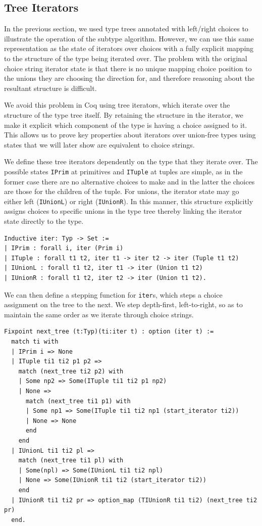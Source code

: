 \documentclass[a4paper,english]{lipics-v2019}
\begin{document}
\subsection{Tree Iterators}

In the previous section, we used type trees annotated with left/right choices
to illustrate the operation of the subtype algorithm. However, we can use this
same representation as the state of iterators over choices with a fully explicit mapping
to the structure of the type being iterated over. The problem with the original 
choice string iterator state is that there is no unique mapping choice position to the
unions they are choosing the direction for, and therefore reasoning about the resultant
structure is difficult.

We avoid this problem in Coq using tree iterators, which iterate
over the structure of the type tree itself. By retaining the structure in the
iterator, we make it explicit which component of the type is having a choice
assigned to it. This allows us to prove key properties about iterators over
union-free types using states that we will later show are equivalent to choice
strings.

We define these tree iterators dependently on the type that they
iterate over. The possible states \verb|IPrim| at primitives and \verb|ITuple|
at tuples are simple, as in the former case there are no alternative choices
to make and in the latter the choices are those for the children of the tuple.
For unions, the iterator state  may go either left (\verb|IUnionL|) or right
(\verb|IUnionR|). In this manner, this structure explicitly assigns choices to
specific unions in the type tree thereby linking the iterator state directly
to the type.

\begin{small}\begin{verbatim}
Inductive iter: Typ -> Set :=
| IPrim : forall i, iter (Prim i)
| ITuple : forall t1 t2, iter t1 -> iter t2 -> iter (Tuple t1 t2)
| IUnionL : forall t1 t2, iter t1 -> iter (Union t1 t2)
| IUnionR : forall t1 t2, iter t2 -> iter (Union t1 t2).
\end{verbatim}\end{small}

We can then define a stepping function for \verb|iter|s, which
steps a choice assignment on the tree to the next. We step depth-first,
left-to-right, so as to maintain the same order as we iterate through 
choice strings.

\begin{verbatim}
Fixpoint next_tree (t:Typ)(ti:iter t) : option (iter t) :=
  match ti with
  | IPrim i => None
  | ITuple ti1 ti2 p1 p2 =>
    match (next_tree ti2 p2) with
    | Some np2 => Some(ITuple ti1 ti2 p1 np2)
    | None =>
      match (next_tree ti1 p1) with
      | Some np1 => Some(ITuple ti1 ti2 np1 (start_iterator ti2))
      | None => None
      end
    end
  | IUnionL ti1 ti2 pl =>
    match (next_tree ti1 pl) with
    | Some(npl) => Some(IUnionL ti1 ti2 npl)
    | None => Some(IUnionR ti1 ti2 (start_iterator ti2))
    end
  | IUnionR ti1 ti2 pr => option_map (TIUnionR ti1 ti2) (next_tree ti2 pr)
  end.
\end{verbatim}
\end{document}
